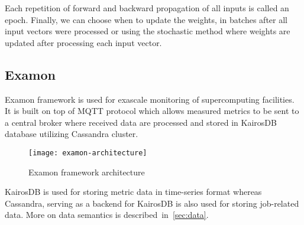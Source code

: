 Each repetition of forward and backward propagation of all inputs is called an epoch. Finally, we can choose when to update the weights, in batches after all input vectors were processed or using the stochastic method where weights are updated after processing each input vector.

\subsection{Examon}
\label{sec:examon}
Examon\cite{examon} framework is used for exascale monitoring of supercomputing facilities. It is built on top of MQTT protocol\cite{locke2010mqtt} which allows measured metrics to be sent to a central broker where received data are processed and stored in KairosDB\cite{KAIROS} database utilizing Cassandra\cite{CASSANDRA} cluster.

\begin{figure}[ht]
    \centering
    \texttt{[image: examon-architecture]}
    \caption{Examon framework architecture}
    \label{arch}
\end{figure}

KairosDB is used for storing metric data in time-series format whereas Cassandra, serving as a backend for KairosDB is also used for storing job-related data. More on data semantics is described~in~\ref{sec:data}.

